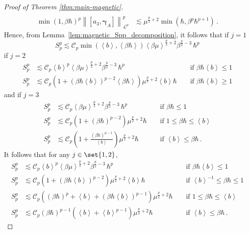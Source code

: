 \documentclass[11pt]{amsart}
\theoremstyle{plain}
\theoremstyle{definition}
\renewcommand	{\L}		{\mathcal L}		%
\newcommand		{\lt}			{\left}				%
\newcommand		{\rt}			{\right}			%
\renewcommand	{\(}			{\lt(}
\renewcommand	{\)}			{\rt)}
\newcommand		{\bangle}[1]	{\lt\langle #1\rt\rangle}
\newcommand		{\weight}[1]	{\bangle{#1}}	%
\newcommand		{\com}[1]		{\lt[{#1}\rt]}		%
\newcommand		{\nrm}[1]		{\lt\lVert #1\rt\rVert}
\newcommand		{\Nrm}[2]		{\nrm{#1}_{#2}}
\newcommand		{\cC}			{\mathcal{C}}
\newcommand		{\opgam}	{{\boldsymbol{\gamma}}}	%
\begin{document}
\begin{proof}[Proof of Theorem \ref{thm:main-magnetic}]
\begin{align*}
			\\
			\min(1,\beta\hbar)^p \Nrm{\com{a_3,\opgam_{A}}}{\L^p}^p &\lesssim \mu^{\frac{p}{2}+2} \min(\hbar,\beta^p\hbar^{p+1}) \, .
		\end{align*}
        Hence, from Lemma~\ref{lem:magnetic_Spp_decomposition}, it follows that if $j=1$
        \begin{equation*}
            S_p^p \lesssim \cC_p \min(\weight{b},\weight{\beta\hbar}) \weight{\beta\mu}^{\frac{p}{2}+2} \beta^{\frac{p}{2}-3} \,\hbar^p
        \end{equation*}
        if $j=2$
        \begin{align*}
            S_p^p &\lesssim \cC_p \weight{b}^p \weight{\beta\mu}^{\frac{p}{2}+2} \beta^{\frac{p}{2}-3} \,\hbar^p && \text{ if } \beta\hbar\weight{b} \leq 1
            \\
            S_p^p &\lesssim \cC_p \lt(1+(\beta\hbar\weight{b})^{p-2}\weight{\beta\hbar}\rt) \mu^{\frac{p}{2}+2} \weight{b} \hbar && \text{ if } \beta\hbar\weight{b} \geq 1
        \end{align*}
        and if $j=3$
        \begin{align*}
            S_p^p &\lesssim \cC_p \weight{\beta\mu}^{\frac{p}{2}+2} \beta^{\frac{p}{2}-3} \, \hbar^p && \text{ if } \beta\hbar \leq 1
            \\
            S_p^p &\lesssim \cC_p \lt(1 + \lt(\beta\hbar\rt)^{p-2}\rt) \mu^{\frac{p}{2}+2} \hbar && \text{ if } 1 \leq \beta\hbar \leq \weight{b}
           \\
            S_p^p &\lesssim \cC_p \lt(1+\tfrac{\lt(\beta\hbar\rt)^{p-1}}{\weight{b}}\rt) \mu^{\frac{p}{2}+2} \hbar && \text{ if } \weight{b} \leq  \beta\hbar \, .
        \end{align*}
        It follows that for any $j\in\set{1,2}$,
        \begin{align*}
            S_p^p &\lesssim \cC_p \weight{b}^p \weight{\beta\mu}^{\frac{p}{2}+2} \beta^{\frac{p}{2}-3} \,\hbar^p && \text{ if } \beta\hbar\weight{b} \leq 1
            \\
            S_p^p &\lesssim \cC_p \lt(1 + (\beta\hbar\weight{b})^{p-2}\rt) \mu^{\frac{p}{2}+2} \weight{b} \hbar && \text{ if } \weight{b}^{-1} \leq \beta\hbar \leq 1
            \\
            S_p^p &\lesssim \cC_p \lt((\beta\hbar)^p + \weight{b} + (\beta\hbar\weight{b})^{p-1}\rt) \mu^{\frac{p}{2}+2}  \hbar && \text{ if } 1 \leq \beta\hbar \leq \weight{b}
            \\
            S_p^p &\lesssim \cC_p \lt(\beta\hbar\rt)^{p-1} \lt(\weight{b} + \weight{b}^{p-1}\rt) \mu^{\frac{p}{2}+2}  \hbar && \text{ if } \weight{b} \leq \beta\hbar \, .

\end{align*}
\end{proof}
\end{document}
